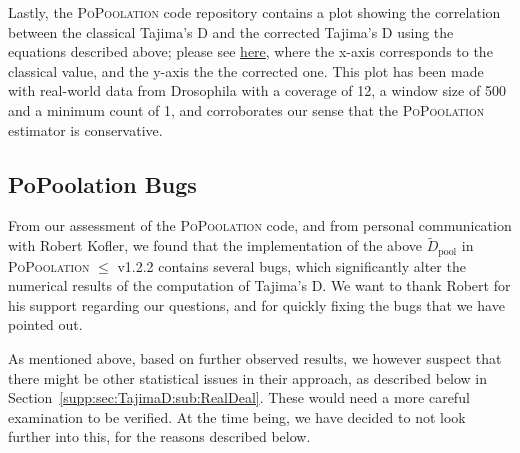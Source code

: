 \documentclass[letterpaper,fontsize=9pt,DIV=12]{scrartcl}
\newcounter{todo}
\newcommand\todo[1]{}
\newcommand\toolname{\textsc}
\newcommand\secref[1]{Section~\ref{#1}}
\begin{document}
Lastly, the \toolname{PoPoolation} code repository contains a plot showing the correlation between the classical Tajima's D
and the corrected Tajima's D using the equations described above;
please see \href{https://github.com/lczech/popoolation/raw/master/files/correlation_classic_correctedTajimasD.png}{here},
where the x-axis corresponds to the classical value, and the y-axis the the corrected one.
This plot has been made with real-world data from Drosophila with a coverage of 12,
a window size of 500 and a minimum count of 1, and corroborates our sense that the \toolname{PoPoolation} estimator is conservative.





\subsection{PoPoolation Bugs}
\label{supp:sec:TajimaD:sub:Bugs}

From our assessment of the \toolname{PoPoolation} code, and from personal communication with Robert Kofler, we found that the implementation of the above $\tilde{D}_\text{pool}$ in \toolname{PoPoolation} $\leq$ v1.2.2 contains several bugs, which significantly alter the numerical results of the computation of Tajima's D.
We want to thank Robert for his support regarding our questions, and for quickly fixing the bugs that we have pointed out.  

As mentioned above, based on further observed results, we however suspect that there might be other statistical issues in their approach, as described below in \secref{supp:sec:TajimaD:sub:RealDeal}. These would need a more careful examination to be verified. At the time being, we have decided to not look further into this, for the reasons described below.
\end{document}
